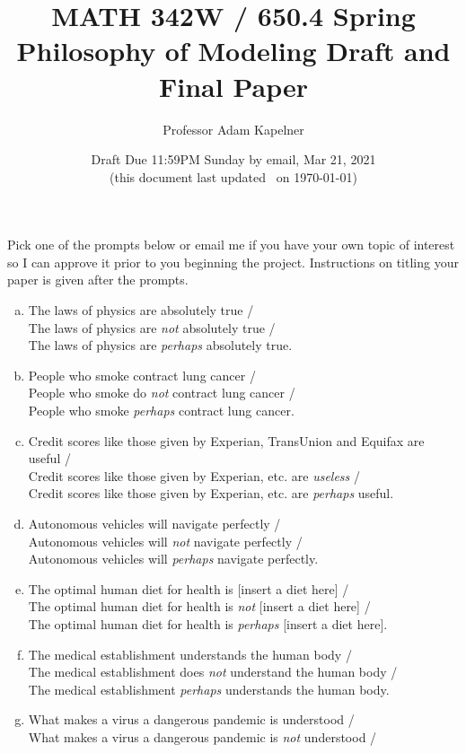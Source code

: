\documentclass[12pt]{article}
\title{MATH 342W / 650.4 Spring \the\year \\ Philosophy of Modeling Draft and Final Paper}
\author{Professor Adam Kapelner} %
\date{Draft Due 11:59PM Sunday by email, Mar 21, 2021 \\ \vspace{0.5cm} \small (this document last updated \currenttime~on \today)}
\begin{document}
\maketitle

\noindent Pick one of the prompts below or email me if you have your own topic of interest so I can approve it prior to you beginning the project. Instructions on titling your paper is given after the prompts.

\begin{enumerate}[(a)]
\item The laws of physics are absolutely true / \\
The laws of physics are \textit{not} absolutely true / \\
The laws of physics are \textit{perhaps} absolutely true.
\item People who smoke contract lung cancer / \\
People who smoke do \textit{not} contract lung cancer / \\
People who smoke \textit{perhaps} contract lung cancer.
\item Credit scores like those given by Experian, TransUnion and Equifax are useful / \\
Credit scores like those given by Experian, etc. are \textit{useless} / \\
Credit scores like those given by Experian, etc. are \textit{perhaps} useful.
\item Autonomous vehicles will navigate perfectly / \\
Autonomous vehicles will \textit{not} navigate perfectly / \\
Autonomous vehicles will \textit{perhaps} navigate perfectly.
\item The optimal human diet for health is [insert a diet here] / \\
The optimal human diet for health is \textit{not} [insert a diet here] / \\
The optimal human diet for health is \textit{perhaps} [insert a diet here].
\item The medical establishment understands the human body / \\
The medical establishment does \textit{not} understand the human body / \\
The medical establishment \textit{perhaps} understands the human body.
\item What makes a virus a dangerous pandemic is understood / \\
What makes a virus a dangerous pandemic is \emph{not} understood / \\

\end{enumerate}
\end{document}
